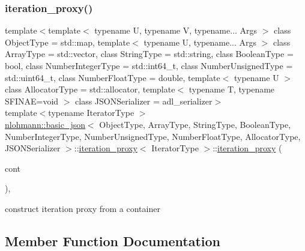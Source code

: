 \subsubsection{\texorpdfstring{iteration\+\_\+proxy()}{iteration\_proxy()}}
{\footnotesize\ttfamily template$<$template$<$ typename U, typename V, typename... Args $>$ class Object\+Type = std\+::map, template$<$ typename U, typename... Args $>$ class Array\+Type = std\+::vector, class String\+Type  = std\+::string, class Boolean\+Type  = bool, class Number\+Integer\+Type  = std\+::int64\+\_\+t, class Number\+Unsigned\+Type  = std\+::uint64\+\_\+t, class Number\+Float\+Type  = double, template$<$ typename U $>$ class Allocator\+Type = std\+::allocator, template$<$ typename T, typename S\+F\+I\+N\+A\+E=void $>$ class J\+S\+O\+N\+Serializer = adl\+\_\+serializer$>$ \\
template$<$typename Iterator\+Type $>$ \\
\hyperlink{classnlohmann_1_1basic__json}{nlohmann\+::basic\+\_\+json}$<$ Object\+Type, Array\+Type, String\+Type, Boolean\+Type, Number\+Integer\+Type, Number\+Unsigned\+Type, Number\+Float\+Type, Allocator\+Type, J\+S\+O\+N\+Serializer $>$\+::\hyperlink{classnlohmann_1_1basic__json_1_1iteration__proxy}{iteration\+\_\+proxy}$<$ Iterator\+Type $>$\+::\hyperlink{classnlohmann_1_1basic__json_1_1iteration__proxy}{iteration\+\_\+proxy} (\begin{DoxyParamCaption}\item[{typename Iterator\+Type\+::reference}]{cont }\end{DoxyParamCaption})\hspace{0.3cm}{\ttfamily [inline]}, {\ttfamily [explicit]}}



construct iteration proxy from a container 



\subsection{Member Function Documentation}
\mbox{\label{classnlohmann_1_1basic__json_1_1iteration__proxy_a98cb29b336b99768602f73883a9e4dff}} 
